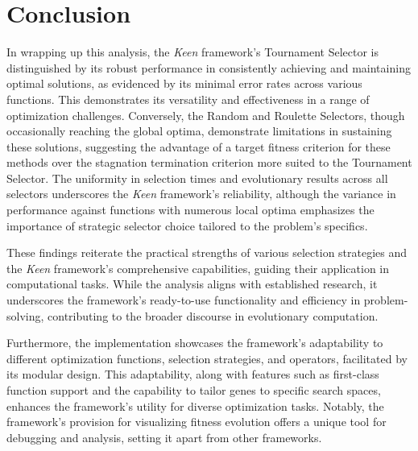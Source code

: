 \section{Conclusion}
\label{sec:fn_opt:conclusion}

    In wrapping up this analysis, the \textit{Keen} framework's Tournament Selector is distinguished by its robust 
    performance in consistently achieving and maintaining optimal solutions, as evidenced by its minimal error rates 
    across various functions. This demonstrates its versatility and effectiveness in a range of optimization 
    challenges. Conversely, the Random and Roulette Selectors, though occasionally reaching the global optima, 
    demonstrate limitations in sustaining these solutions, suggesting the advantage of a target fitness criterion for 
    these methods over the stagnation termination criterion more suited to the Tournament Selector. The uniformity in 
    selection times and evolutionary results across all selectors underscores the \textit{Keen} framework's reliability, although the variance in performance against functions with numerous local optima emphasizes the importance of strategic selector choice tailored to the problem's specifics.

    These findings reiterate the practical strengths of various selection strategies and the \textit{Keen} framework's 
    comprehensive capabilities, guiding their application in computational tasks. While the analysis aligns with 
    established research, it underscores the framework's ready-to-use functionality and efficiency in problem-solving, 
    contributing to the broader discourse in evolutionary computation.

    Furthermore, the implementation showcases the framework's adaptability to different optimization functions, 
    selection strategies, and operators, facilitated by its modular design. This adaptability, along with features such 
    as first-class function support and the capability to tailor genes to specific search spaces, enhances the 
    framework's utility for diverse optimization tasks. Notably, the framework's provision for visualizing fitness 
    evolution offers a unique tool for debugging and analysis, setting it apart from other frameworks.
